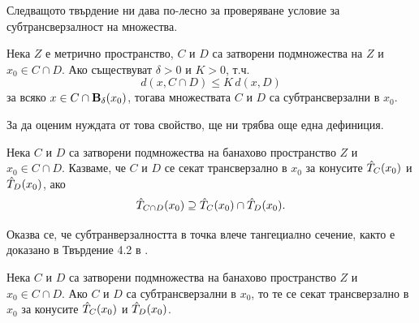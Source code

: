 Следващото твърдение ни дава по-лесно за проверяване условие за субтрансверзалност на множества.

\begin{proposition} \label{Subsiff}
    Нека $Z$ е метрично пространство, $C$ и $D$ са затворени подмножества на $Z$ и $x_0\in C\cap D$.
    Ако съществуват $\delta > 0$ и $K > 0$, т.ч.
    \[
        d(x, C\cap D) \leq K\,d(x,D)
    \]
    за всяко $x\in C\cap \textbf{B}_\delta(x_0)$, тогава множествата $C$ и $D$ са субтрансверзални в $x_0$.
\end{proposition}

За да оценим нуждата от това свойство, ще ни трябва още една дефиниция.

\begin{definition}
    Нека $C$ и $D$ са затворени подмножества на банахово пространство $Z$ и $x_0\in C\cap D$.
    Казваме, че $C$ и $D$ се секат трансверзално в $x_0$ за конусите $\hat T_C(x_0)$ и $\hat T_D(x_0)$, ако
    \[
        \hat T_{C\cap D}(x_0) \supseteq \hat T_C(x_0) \cap \hat T_D(x_0).
    \]
\end{definition}

Оказва се, че субтранверзалността в точка влече тангециално сечение, както е доказано в Твърдение 4.2 в \cite{TangentialTransversality}.

\begin{proposition} \label{TIP}
    Нека $C$ и $D$ са затворени подмножества на банахово пространство $Z$ и $x_0\in C\cap D$.
    Ако $C$ и $D$ са субтрансверзални в $x_0$, то те се секат трансверзално в $x_0$ за конусите $\hat T_C(x_0)$ и $\hat T_D(x_0)$.
\end{proposition}
